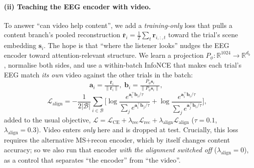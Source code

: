 \documentclass[10pt,twocolumn]{article}
\begin{document}
\paragraph{(ii) Teaching the EEG encoder with video.}
To answer ``can video help content'', we add a \emph{training-only} loss that
pulls a content branch's pooled reconstruction
$\bar{\mathbf r}_i\!=\!\tfrac1T\sum_t\mathbf r_{i,:,t}$ toward the trial's scene
embedding $\mathbf s_i$. The hope is that ``where the listener looks'' nudges the
EEG encoder toward attention-relevant structure. We learn a projection
$P_\phi\!:\!\mathbb R^{1024}\!\to\!\mathbb R^{d_b}$, normalise both sides, and use
a within-batch InfoNCE that makes each trial's EEG match \emph{its own} video
against the other trials in the batch:
\begin{equation}
\mathbf a_i=\tfrac{\bar{\mathbf r}_i}{\lVert\bar{\mathbf r}_i\rVert},\;
\mathbf b_i=\tfrac{P_\phi\mathbf s_i}{\lVert P_\phi\mathbf s_i\rVert},\;
\label{eq:alignembed}
\end{equation}
\begin{equation}
\mathcal L_{\text{align}}=-\frac{1}{2|\mathcal B|}\!\sum_{i\in\mathcal B}\!\Bigg[
\log\frac{e^{\mathbf a_i^{\!\top}\mathbf b_i/\tau}}{\sum_je^{\mathbf a_i^{\!\top}\mathbf b_j/\tau}}
+\log\frac{e^{\mathbf a_i^{\!\top}\mathbf b_i/\tau}}{\sum_je^{\mathbf a_j^{\!\top}\mathbf b_i/\tau}}\Bigg],
\label{eq:infonce}
\end{equation}
added to the usual objective,
$\mathcal L=\mathcal L_{\text{CE}}+\lambda_{\text{rec}}\mathcal L_{\text{rec}}
+\lambda_{\text{align}}\mathcal L_{\text{align}}$
($\tau\!=\!0.1$, $\lambda_{\text{align}}\!=\!0.3$). Video enters \emph{only} here
and is dropped at test. Crucially, this loss requires the alternative MS$+$recon
encoder, which by itself changes content accuracy; so we also run that encoder
\emph{with the alignment switched off} ($\lambda_{\text{align}}\!=\!0$), as a
control that separates ``the encoder'' from ``the video''.
\end{document}
